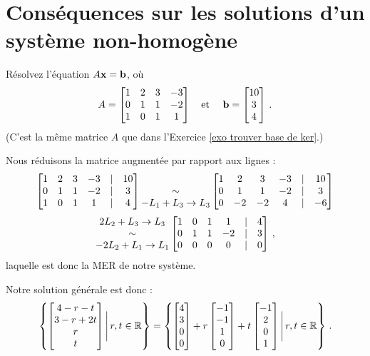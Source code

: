 \section{Cons\'equences sur les solutions d'un système non-homogène}

\begin{myprob} R\'esolvez l'équation $A\mathbf{x} = \mathbf{b}$, o\`u 
$$
A = \left[ \begin{matrix} 
1 & 2 & 3 &-3\\ 
0 & 1 & 1 &-2\\ 
1 & 0 & 1 & 1 \end{matrix} \right] \quad \textrm{et } \quad \mathbf{b} = \left[ \begin{matrix} 10 \\ 3\\ 4 \end{matrix} \right]\,.
$$
(C'est la même matrice $A$ que dans l'Exercice \ref{exo trouver base de ker}.)

\begin{mysol} Nous réduisons la matrice augmentée par rapport aux lignes :
$$
\left[ \begin{matrix} 
1 & 2 & 3 &-3&|&10\\ 
0 & 1 & 1 &-2&|&3\\ 
1 & 0 & 1 & 1&|&4 \end{matrix} \right]
\begin{matrix} \\\sim \\ -L_1+L_3 \to L_3 \end{matrix}
\left[ \begin{matrix} 
1 & 2 & 3 &-3&|&10\\ 
0 & 1 & 1 &-2&|&3\\ 
0 & -2 & -2 & 4&|&-6 \end{matrix} \right]
$$
$$
\begin{matrix} 2L_2+L_3 \to L_3\\ \sim \\ -2L_2+L_1 \to L_1 \end{matrix}
\left[ \begin{matrix} 
1 & 0 & 1 &1&|&4\\ 
0 & 1 & 1 &-2&|&3\\ 
0 & 0 & 0 & 0&|&0 \end{matrix} \right]\,,
$$
laquelle est donc la MER de notre système.  

Notre solution générale est donc :
$$
\left\{ \left[ \begin{matrix} 4-r-t\\3-r+2t\\r\\t \end{matrix} \right] \Bigg|\, r,t\in\mathbb{R}\right\}
= \left\{ \left[ \begin{matrix} 4\\3\\0\\0 \end{matrix} \right]+r\left[ \begin{matrix} -1\\-1\\1\\0 \end{matrix} \right] +t\left[ \begin{matrix} -1\\2\\0\\1 \end{matrix} \right] \Bigg|\, r,t\in\mathbb{R}\right\}\,.
$$
\end{mysol}\end{myprob}

